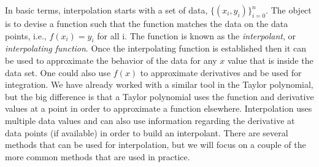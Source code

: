 \documentclass[twoside]{article}
\def\ds{\displaystyle}
\begin{document}
In basic terms, interpolation starts with a set of data, $\ds \{(x_i, y_i)\}_{i=0}^n$. The object is to devise a function such that the function matches the data on the data points, i.e., $\ds f(x_i)=y_i$ for all i. The function is known as the {\it interpolant}, or {\it interpolating function}. Once the interpolating function is established then it can be used to approximate the behavior of the data for any $x$ value that is inside the data set. One could also use $f(x)$ to approximate derivatives and be used for integration. We have already worked with a similar tool in the Taylor polynomial, but the big difference is that a Taylor polynomial uses the function and derivative values at a point in order to approximate a function elsewhere. Interpolation uses multiple data values and can also use information regarding the derivative at data points (if available) in order to build an interpolant. There are several methods that can be used for interpolation, but we will focus on a couple of the more common methods that are used in practice. 
\end{document}

